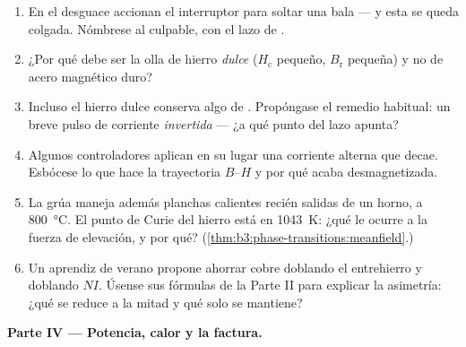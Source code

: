 \begin{problem}
\begin{enumerate}[resume]
  \item En el desguace accionan el interruptor para soltar una bala --- y esta se queda
        colgada. Nómbrese al culpable, con el lazo de .
  \item ¿Por qué debe ser la olla de hierro \emph{dulce} ($H_{\text{c}}$
        pequeño, $B_{\text{r}}$ pequeña) y no de acero
        magnético duro?
  \item Incluso el hierro dulce conserva algo de . Propóngase el
        remedio habitual: un breve pulso de corriente \emph{invertida} ---
        ¿a qué punto del lazo apunta?
  \item Algunos controladores aplican en su lugar una corriente alterna
        que decae. Esbócese lo que hace la trayectoria $B$--$H$ y por qué
        acaba desmagnetizada.
  \item La grúa maneja además planchas calientes recién salidas de un horno,
        a \qty{800}{\celsius}. El punto de Curie del hierro está en
        \qty{1043}{K}: ¿qué le ocurre a la fuerza de elevación, y por qué?
        (\cref{thm:b3:phase-transitions:meanfield}.)
  \item Un aprendiz de verano propone ahorrar cobre doblando
        el entrehierro y doblando $NI$. Úsense sus fórmulas de la Parte II para
        explicar la asimetría: ¿qué se reduce a la mitad y qué solo
        se mantiene?
\end{enumerate}

\medskip\noindent\textbf{Parte IV --- Potencia, calor y la factura.}


\end{problem}
